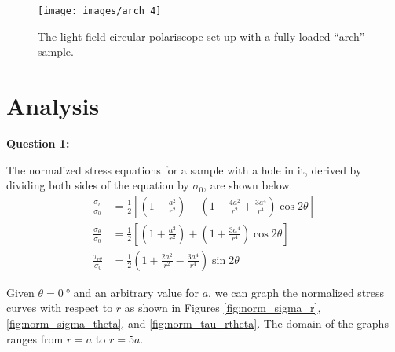 \documentclass[12 pt]{article}
\begin{document}
\begin{figure}[htbp]
\centering
\texttt{[image: images/arch\_4]}
\caption{The light-field circular polariscope set up with a fully loaded ``arch'' sample.}
\label{fig:arch_4}
\end{figure}

\section{Analysis} \label{analysis}
\textbf{Question 1:}

The normalized stress equations for a sample with a hole in it, derived by dividing both sides of the equation by $\sigma_0$, are shown below.
\begin{align}
\frac{\sigma_r}{\sigma_0}&=\frac{1}{2}\left[\left(1-\frac{a^2}{r^2}\right)-\left(1-\frac{4a^2}{r^2}+\frac{3a^4}{r^4}\right)\cos2\theta\right] \\
\frac{\sigma_\theta}{\sigma_0}&=\frac{1}{2}\left[\left(1+\frac{a^2}{r^2}\right)+\left(1+\frac{3a^4}{r^4}\right)\cos2\theta\right] \label{eqn:norm_sigma_theta} \\
\frac{\tau_{r\theta}}{\sigma_0}&=\frac{1}{2}\left(1+\frac{2a^2}{r^2}-\frac{3a^4}{r^4}\right)\sin2\theta
\end{align}

Given $\theta=\qty{0}{\degree}$ and an arbitrary value for $a$, we can graph the normalized stress curves with respect to $r$ as shown in Figures \ref{fig:norm_sigma_r}, \ref{fig:norm_sigma_theta}, and \ref{fig:norm_tau_rtheta}. The domain of the graphs ranges from $r=a$ to $r=5a$.
\end{document}
